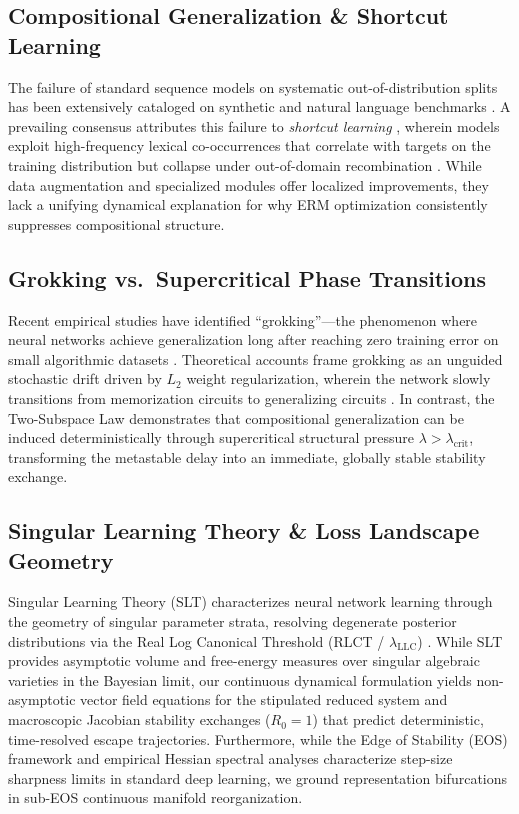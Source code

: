 \documentclass{article}
\theoremstyle{plain}
\theoremstyle{definition}
\begin{document}
\subsection{Compositional Generalization \& Shortcut Learning}
The failure of standard sequence models on systematic out-of-distribution splits has been extensively cataloged on synthetic and natural language benchmarks \citep{Lake2018Generalization,Kim2020COGS,Hupkes2019Compositionality,Keysers2019Measuring,Ruis2020Benchmark,Li2023SLOG}. A prevailing consensus attributes this failure to \emph{shortcut learning} \citep{Geirhos2020Shortcut}, wherein models exploit high-frequency lexical co-occurrences that correlate with targets on the training distribution but collapse under out-of-domain recombination \citep{Kim2022Uncontrolled,Wu2023ReCOGS,Jabbar2025Distinguishing}. While data augmentation \citep{Furrer2020Compositional} and specialized modules \citep{Drozdov2022Compositional,Kohli2026Loop} offer localized improvements, they lack a unifying dynamical explanation for why ERM optimization consistently suppresses compositional structure.

\subsection{Grokking vs.\ Supercritical Phase Transitions}
Recent empirical studies have identified ``grokking''—the phenomenon where neural networks achieve generalization long after reaching zero training error on small algorithmic datasets \citep{Power2022Grokking,Liu2022Grokking}. Theoretical accounts frame grokking as an unguided stochastic drift driven by $L_2$ weight regularization, wherein the network slowly transitions from memorization circuits to generalizing circuits \citep{Varma2023Explaining,Merrill2023Tale}. In contrast, the Two-Subspace Law demonstrates that compositional generalization can be induced deterministically through supercritical structural pressure $\lambda > \lambda_{\text{crit}}$, transforming the metastable delay into an immediate, globally stable stability exchange.

\subsection{Singular Learning Theory \& Loss Landscape Geometry}
Singular Learning Theory (SLT) characterizes neural network learning through the geometry of singular parameter strata, resolving degenerate posterior distributions via the Real Log Canonical Threshold (RLCT / $\lambda_{\text{LLC}}$) \citep{Watanabe2009Algebraic,Lau2023Quantifying}. While SLT provides asymptotic volume and free-energy measures over singular algebraic varieties in the Bayesian limit, our continuous dynamical formulation yields non-asymptotic vector field equations for the stipulated reduced system and macroscopic Jacobian stability exchanges ($R_0 = 1$) that predict deterministic, time-resolved escape trajectories. Furthermore, while the Edge of Stability (EOS) framework \citep{Cohen2021Gradient} and empirical Hessian spectral analyses \citep{Ghorbani2019Investigation,Yao2020PyHessian} characterize step-size sharpness limits in standard deep learning, we ground representation bifurcations in sub-EOS continuous manifold reorganization.
\end{document}
